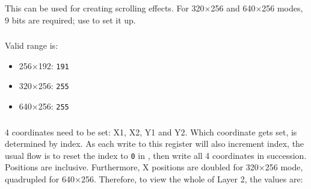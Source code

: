 \begin{NextPort}
\end{NextPort}


\subsubsection{}

\begin{NextPort}
\end{NextPort}

This can be used for creating scrolling effects. For 320$\times$256 and 640$\times$256 modes, 9 bits are required; use  to set it up.


\pagebreak
\subsubsection{}

\begin{NextPort}
\end{NextPort}

Valid range is:

\begin{itemize}[topsep=1pt,itemsep=1pt]
	\item 256$\times$192: {\tt 191}
	\item 320$\times$256: {\tt 255}
	\item 640$\times$256: {\tt 255}
\end{itemize}


\subsubsection{}

\begin{NextPort}
\end{NextPort}

4 coordinates need to be set: X1, X2, Y1 and Y2. Which coordinate gets set, is determined by index. As each write to this register will also increment index, the usual flow is to reset the index to {\tt 0} in , then write all 4 coordinates in succession. Positions are inclusive. Furthermore, X positions are doubled for 320$\times$256 mode, quadrupled for 640$\times$256. Therefore, to view the whole of Layer 2, the values are:

